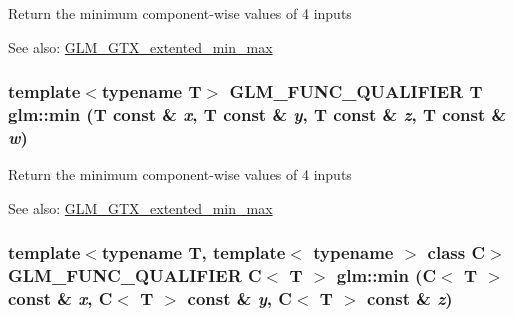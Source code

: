 Return the minimum component-wise values of 4 inputs \begin{Desc}
\item[See also:]\hyperlink{group__gtx__extented__min__max}{GLM\_\-GTX\_\-extented\_\-min\_\-max} \end{Desc}
\hypertarget{group__gtx__extented__min__max_gdb4c9ecc8ca939f43ba21f8f13a2ad5b}{
\subsubsection[min]{\setlength{\rightskip}{0pt plus 5cm}template$<$typename T$>$ GLM\_\-FUNC\_\-QUALIFIER T glm::min (T const \& {\em x}, \/  T const \& {\em y}, \/  T const \& {\em z}, \/  T const \& {\em w})}}
\label{group__gtx__extented__min__max_gdb4c9ecc8ca939f43ba21f8f13a2ad5b}


Return the minimum component-wise values of 4 inputs \begin{Desc}
\item[See also:]\hyperlink{group__gtx__extented__min__max}{GLM\_\-GTX\_\-extented\_\-min\_\-max} \end{Desc}
\hypertarget{group__gtx__extented__min__max_g50d031fb07c48e0626d12bf891df996d}{
\subsubsection[min]{\setlength{\rightskip}{0pt plus 5cm}template$<$typename T, template$<$ typename $>$ class C$>$ GLM\_\-FUNC\_\-QUALIFIER C$<$ T $>$ glm::min (C$<$ T $>$ const \& {\em x}, \/  C$<$ T $>$ const \& {\em y}, \/  C$<$ T $>$ const \& {\em z})}}
\label{group__gtx__extented__min__max_g50d031fb07c48e0626d12bf891df996d}


